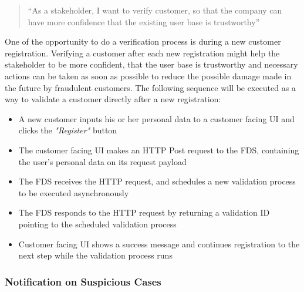 \begin{quotation}
 \enquote{As a stakeholder, I want to verify customer, so that the company can have more confidence that the existing user base is trustworthy} 
\end{quotation}

One of the opportunity to do a verification process is during a new customer registration. Verifying a customer after each new registration might help the stakeholder to be more confident, that the user base is trustworthy and necessary actions can be taken as soon as possible to reduce the possible damage made in the future by fraudulent customers. The following sequence will be executed as a way to validate a customer directly after a new registration:

\begin{itemize}
 \item A new customer inputs his or her personal data to a customer facing UI and clicks the \emph{"Register"} button
 \item The customer facing UI makes an HTTP Post request to the FDS, containing the user's personal data on its request payload
 \item The FDS receives the HTTP request, and schedules a new validation process to be executed asynchronously
 \item The FDS responds to the HTTP request by returning a validation ID pointing to the scheduled validation process
 \item Customer facing UI shows a success message and continues registration to the next step while the validation process runs 
\end{itemize}


\subsubsection{Notification on Suspicious Cases}
 \label{subsection:seq-notification}

